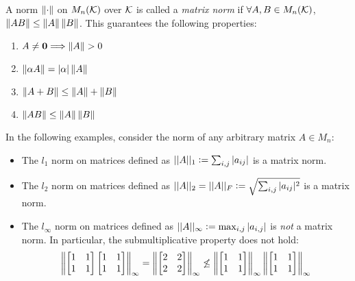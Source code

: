 \begin{definition}
\label{def:matrix-norm}
A norm $\left\lVert\cdot\right\rVert$ on $M_n(\mathcal{K})$ over $\mathcal{K}$ is called a \textit{matrix norm} if $\forall A, B \in M_n(\mathcal{K})$, $\left\lVert AB\right\rVert \leq \left\lVert A\right\rVert \left\lVert B\right\rVert$. This guarantees the following properties:
\begin{enumerate}[label=(\roman*)]
    \item $A \not= \mathbf{0} \Longrightarrow \left\lVert A\right\rVert > 0$
    \item $\left\lVert\alpha A\right\rVert = |\alpha| \left\lVert A\right\rVert$
    \item $\left\lVert A + B\right\rVert \leq \left\lVert A\right\rVert + \left\lVert B\right\rVert$
    \item $\left\lVert AB\right\rVert \leq \left\lVert A\right\rVert \left\lVert B\right\rVert$
\end{enumerate}
\end{definition}

\begin{example}
In the following examples, consider the norm of any arbitrary matrix $A \in M_n$:
\begin{itemize}
    \item The $l_1$ norm on matrices defined as $||A||_1 \vcentcolon= \sum_{i,j} |a_{ij}|$ is a matrix norm. 
    \item The $l_2$ norm on matrices defined as $||A||_2 = ||A||_F \vcentcolon= \sqrt{\sum_{i,j} |a_{ij}|^2}$ is a matrix norm.
    \item The $l_\infty$ norm on matrices defined as $||A||_\infty \vcentcolon= \max_{i,j} |a_{i,j}|$ is \textit{not} a matrix norm. In particular, the submultiplicative property does not hold:
    \[
        \left\lVert
        \begin{bmatrix}1 & 1 \\ 1 & 1\end{bmatrix}
        \begin{bmatrix}1 & 1 \\ 1 & 1\end{bmatrix}
        \right\rVert_\infty 
        = \left\lVert
        \begin{bmatrix}2 & 2 \\ 2 & 2\end{bmatrix}
        \right\rVert_\infty 
        \not\le 
        \left\lVert\begin{bmatrix}1 & 1 \\ 1 & 1\end{bmatrix}\right\rVert_\infty \left\lVert\begin{bmatrix}1 & 1 \\ 1 & 1\end{bmatrix}\right\rVert_\infty 
    \]
\end{itemize}
\end{example}

